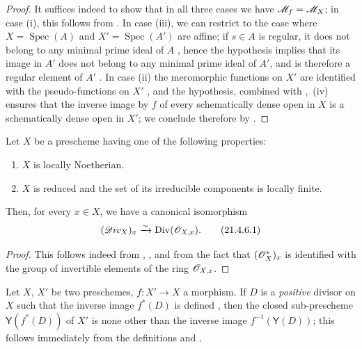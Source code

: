 \begin{proof}
It suffices indeed to show that in all three cases we have $\mathscr{M}_f=\mathscr{M}_X$;
in case (i), this follows from .
In case (iii), we can restrict to the case where $X=\operatorname{Spec}(A)$ and $X'=\operatorname{Spec}(A')$ are affine;
if $s\in A$ is regular, it does not belong to any minimal prime ideal of $A$ , hence the hypothesis implies that its image in $A'$ does not belong to any minimal prime ideal of $A'$, and is therefore a regular element of $A'$ .
In case (ii) the meromorphic functions on $X'$ are identified with the pseudo-functions on $X'$ , and the hypothesis, combined with ,~(iv) ensures that the inverse image
by $f$ of every schematically dense open in $X$ is a schematically dense open in $X'$;
we conclude therefore by .
\end{proof}

\begin{corollary}[21.4.6]
\label{IV.21.4.6}
Let $X$ be a prescheme having one of the following properties:
\begin{enumerate}[label=\textup{(\roman*)}]
  \item $X$ is locally Noetherian.
  \item $X$ is reduced and the set of its irreducible components is locally finite.
\end{enumerate}
Then, for every $x\in X$, we have a canonical isomorphism
\[
\label{IV.21.4.6.1}
  (\mathscr{D}iv_X)_x\xrightarrow{\sim}\operatorname{Div}(\mathscr{O}_{X,x}).
  \tag{21.4.6.1}
\]
\end{corollary}

\begin{proof}
This follows indeed from , , and from the fact that $(\mathscr{O}_X^*)_x$ is identified with the group of invertible elements of the ring $\mathscr{O}_{X,x}$.
\end{proof}

\begin{env}[21.4.7]
\label{IV.21.4.7}
Let $X$, $X'$ be two preschemes, $f:X'\to X$ a morphism.
If $D$ is a \emph{positive} divisor on $X$ such that the inverse image $f^*(D)$ is defined , then the closed sub-prescheme $\boldsymbol{\mathsf{Y}}(f^*(D))$ of $X'$ is none other than the inverse image $f^{-1}(\boldsymbol{\mathsf{Y}}(D))$;
this follows immediately from the definitions  and .
\end{env}

